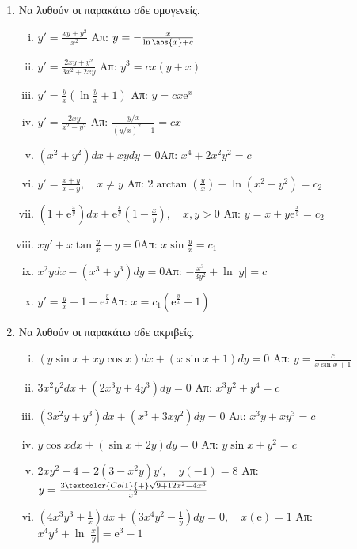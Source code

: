 \begin{enumerate}
  \item Να λυθούν οι παρακάτω σδε ομογενείς.

    \begin{enumerate}[i)]
      \item $ y' = \frac{xy+y^{2}}{x^{2}} $ %
        \hfill Απ: $ y= - \frac{x}{\ln{\abs{x} } + c} $ 
      \item $ y' = \frac{2xy+y^{2}}{3x^{2}+2xy} $ %
        \hfill Απ: $ y^{3}=cx(y+x) $ 
      \item $ y' = \frac{y}{x} (\ln{\frac{y}{x}} +1) $ %
        \hfill Απ: $ y=cx \mathrm{e}^{x} $ 
      \item $ y' = \frac{2xy}{x^{2}-y^{2}} $ %
        \hfill Απ: $ \frac{y/x}{(y/x)^{2}+1} = cx $ 
      \item $(x^2+y^2)dx+xydy=0$\hfill Απ: $x^4+2x^2y^2=c$
      \item $y'=\frac{x+y}{x-y}, \quad x\neq y$
        \hfill Απ: $2\arctan (\frac{y}{x})-\ln (x^2+y^2)=c_2$
      \item $(1+ \mathrm{e}^{\frac{x}{y}})dx+ \mathrm{e}^{\frac{x}{y}}(1-\frac{x}{y}), 
        \quad x,y>0$
        \hfill Απ: $y=x+y \mathrm{e}^{\frac{x}{y}}=c_2$
      \item $xy'+x\tan \frac{y}{x}-y=0$\hfill Απ: $x\sin \frac{y}{x}=c_1$
      \item $x^2ydx-(x^3+y^3)dy=0$\hfill Απ: $-\frac{x^3}{3y^2}+\ln|y|=c$
      \item $y'=\frac{y}{x}+1- \mathrm{e}^{\frac{y}{x}}$\hfill Απ: $x=c_1(
        \mathrm{e}^{\frac{y}{x}}-1)$
    \end{enumerate}

  \item Να λυθούν οι παρακάτω σδε ακριβείς.

    \begin{enumerate}[i)]
      \item $ (y \sin{x} + xy \cos{x})dx + (x \sin{x} +1) dy=0 $ %
        \hfill Απ: $ y= \frac{c}{x \sin{x} +1} $ 
      \item $ 3x^{2}y^{2}dx+(2x^{3}y+4y^{3})dy=0$  %
        \hfill Απ: $ x^{3}y^{2}+y^{4}=c $
      \item $ (3x^{2}y+y^{3})dx+(x^{3}+3xy^{2})dy=0 $ %
        \hfill Απ: $ x^{3}y+xy^{3}=c $
      \item $ y \cos{x} dx + (\sin{x} + 2y)dy=0 $ %
        \hfill Απ: $ y \sin{x} + y^{2}=c $ 
      \item $ 2xy^{2}+4 = 2(3-x^{2}y)y', \quad y(-1)=8 $ %
        \hfill Απ: $ y= \frac{3 \textcolor{Col1}{+} \sqrt{9+12x^{2}-4x^{3}}}{x^{2}} $ 
      \item $(4x^3y^3+\frac{1}{x})dx+(3x^4y^2-\frac{1}{y})dy=0, \quad x(\mathrm{e})=1$
        \hfill Απ: $x^4y^3+\ln |\frac{x}{y}|= \mathrm{e}^3-1$
    \end{enumerate}


\end{enumerate}
